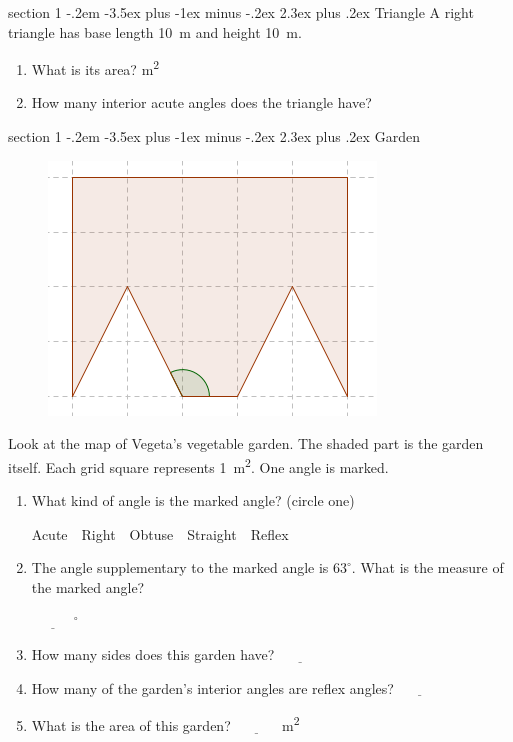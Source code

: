 \documentclass[12pt,letterpaper]{article}
\makeatletter
\newenvironment{problem}{\@startsection
       {section}
       {1}
       {-.2em}
       {-3.5ex plus -1ex minus -.2ex}
       {2.3ex plus .2ex}
       {\pagebreak[3]
       \large\bf\noindent{Problem }
       }
       }
\makeatother
\begin{document}
\begin{problem}{Triangle}
 A right triangle has base length \SI{10}{\meter}
 and height \SI{10}{\meter}.

 \begin{enumerate}
  \item What is its area?
  \hfill \underline{\hspace{3em}} \si{\meter^2}
  \item How many interior acute angles does the triangle have?
  \hfill \underline{\hspace{3em}}
 \end{enumerate}
\end{problem}

\begin{problem}{Garden}
\begin{figure}[h]
  \begin{center}
    \includegraphics[width=.4\textwidth]{garden.png}
  \end{center}
\end{figure}

 Look at the map of Vegeta's vegetable garden. The shaded part is the
 garden itself. Each grid square represents \SI{1}{\meter^2}. One angle is marked.

 \begin{enumerate}
  \item What kind of angle is the marked angle? (circle one)

  \hfill Acute~~Right~~Obtuse~~Straight~~Reflex

  \item The angle supplementary to the marked angle is $63^\circ$.
  What is the measure of the marked angle?

  \hfill $\underline{\hspace{3em}}^\circ$

  \item How many sides does this garden have? \hfill $\underline{\hspace{3em}}$

  \item How many of the garden's interior angles are reflex angles?
  \hfill $\underline{\hspace{3em}}$

  \item What is the area of this garden? \hfill $\underline{\hspace{3em}}$
  \si{\meter^2}
 \end{enumerate}

\end{problem}
\end{document}
